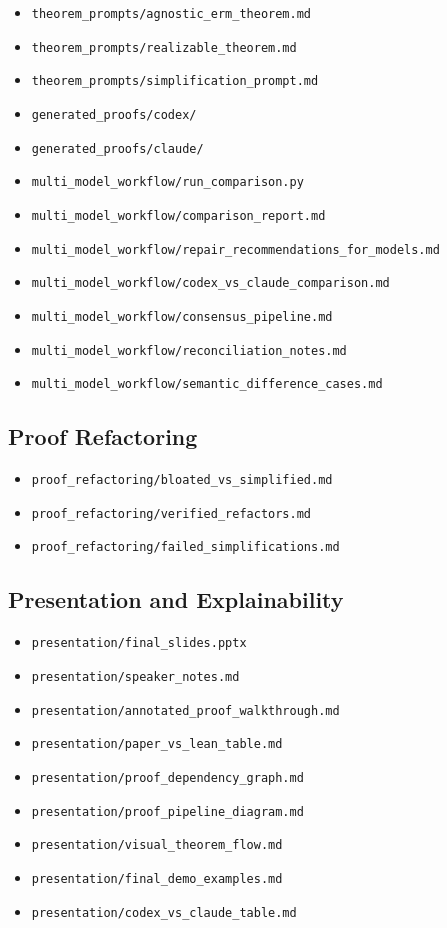 \documentclass[11pt]{article}
\theoremstyle{definition}
\begin{document}
\begin{itemize}[leftmargin=*]
  \item \texttt{theorem\_prompts/agnostic\_erm\_theorem.md}
  \item \texttt{theorem\_prompts/realizable\_theorem.md}
  \item \texttt{theorem\_prompts/simplification\_prompt.md}
  \item \texttt{generated\_proofs/codex/}
  \item \texttt{generated\_proofs/claude/}
  \item \texttt{multi\_model\_workflow/run\_comparison.py}
  \item \texttt{multi\_model\_workflow/comparison\_report.md}
  \item \texttt{multi\_model\_workflow/repair\_recommendations\_for\_models.md}
  \item \texttt{multi\_model\_workflow/codex\_vs\_claude\_comparison.md}
  \item \texttt{multi\_model\_workflow/consensus\_pipeline.md}
  \item \texttt{multi\_model\_workflow/reconciliation\_notes.md}
  \item \texttt{multi\_model\_workflow/semantic\_difference\_cases.md}
\end{itemize}

\subsection{Proof Refactoring}

\begin{itemize}[leftmargin=*]
  \item \texttt{proof\_refactoring/bloated\_vs\_simplified.md}
  \item \texttt{proof\_refactoring/verified\_refactors.md}
  \item \texttt{proof\_refactoring/failed\_simplifications.md}
\end{itemize}

\subsection{Presentation and Explainability}

\begin{itemize}[leftmargin=*]
  \item \texttt{presentation/final\_slides.pptx}
  \item \texttt{presentation/speaker\_notes.md}
  \item \texttt{presentation/annotated\_proof\_walkthrough.md}
  \item \texttt{presentation/paper\_vs\_lean\_table.md}
  \item \texttt{presentation/proof\_dependency\_graph.md}
  \item \texttt{presentation/proof\_pipeline\_diagram.md}
  \item \texttt{presentation/visual\_theorem\_flow.md}
  \item \texttt{presentation/final\_demo\_examples.md}
  \item \texttt{presentation/codex\_vs\_claude\_table.md}
\end{itemize}
\end{document}
